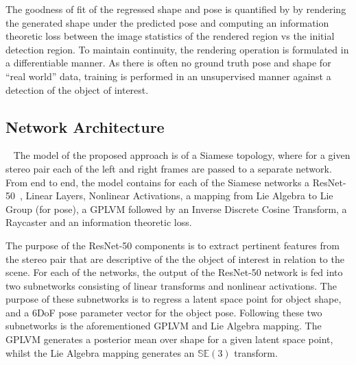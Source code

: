The goodness of fit of the regressed shape and pose is quantified by by rendering the generated shape 
under the predicted pose and computing an information theoretic loss between the image statistics of 
the rendered region vs the initial detection region. To maintain continuity, the rendering operation is 
formulated in a differentiable manner. As there is often no ground truth pose and shape for ``real world'' 
data, training is performed in an unsupervised manner against a detection of the object of interest.

\subsection{Network Architecture}
~\label{subsec:spp_network_architecture}
The model of the proposed approach is of a Siamese topology, where for a given stereo 
pair each of the left and right frames are passed to a separate network. From end to 
end, the model contains for each of the Siamese networks a ResNet-50~\cite{He2015}, 
Linear Layers, Nonlinear Activations, a mapping from Lie Algebra to Lie Group (for pose),
a GPLVM followed by an Inverse Discrete Cosine Transform, a Raycaster and an information 
theoretic loss. 

The purpose of the ResNet-50 components is to extract pertinent features from the stereo 
pair that are descriptive of the the object of interest in relation to the scene. For each 
of the networks, the output of the ResNet-50 network is fed into two subnetworks consisting 
of linear transforms and nonlinear activations. The purpose of these subnetworks is to regress 
a latent space point for object shape, and a 6DoF pose parameter vector for the object pose. 
Following these two subnetworks is the aforementioned GPLVM and Lie Algebra mapping. The 
GPLVM generates a posterior mean over shape for a given latent space point, whilst the 
Lie Algebra mapping generates an \( \mathbb{SE}(3) \) transform. 

